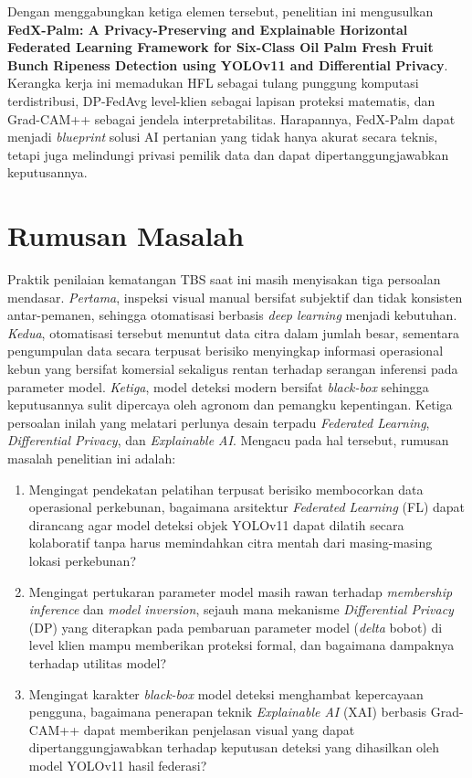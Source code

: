 Dengan menggabungkan ketiga elemen tersebut, penelitian ini mengusulkan \textbf{FedX-Palm: A Privacy-Preserving and Explainable Horizontal Federated Learning Framework for Six-Class Oil Palm Fresh Fruit Bunch Ripeness Detection using YOLOv11 and Differential Privacy}. Kerangka kerja ini memadukan HFL sebagai tulang punggung komputasi terdistribusi, DP-FedAvg level-klien sebagai lapisan proteksi matematis, dan Grad-CAM++ sebagai jendela interpretabilitas. Harapannya, FedX-Palm dapat menjadi \emph{blueprint} solusi AI pertanian yang tidak hanya akurat secara teknis, tetapi juga melindungi privasi pemilik data dan dapat dipertanggungjawabkan keputusannya.

\section{Rumusan Masalah}
\label{sec:rumusan-masalah}
Praktik penilaian kematangan TBS saat ini masih menyisakan tiga persoalan mendasar. \emph{Pertama}, inspeksi visual manual bersifat subjektif dan tidak konsisten antar-pemanen, sehingga otomatisasi berbasis \emph{deep learning} menjadi kebutuhan. \emph{Kedua}, otomatisasi tersebut menuntut data citra dalam jumlah besar, sementara pengumpulan data secara terpusat berisiko menyingkap informasi operasional kebun yang bersifat komersial sekaligus rentan terhadap serangan inferensi pada parameter model. \emph{Ketiga}, model deteksi modern bersifat \emph{black-box} sehingga keputusannya sulit dipercaya oleh agronom dan pemangku kepentingan. Ketiga persoalan inilah yang melatari perlunya desain terpadu \emph{Federated Learning}, \emph{Differential Privacy}, dan \emph{Explainable AI}. Mengacu pada hal tersebut, rumusan masalah penelitian ini adalah:
\begin{enumerate}
    \item Mengingat pendekatan pelatihan terpusat berisiko membocorkan data operasional perkebunan, bagaimana arsitektur \emph{Federated Learning} (FL) dapat dirancang agar model deteksi objek YOLOv11 dapat dilatih secara kolaboratif tanpa harus memindahkan citra mentah dari masing-masing lokasi perkebunan?
    \item Mengingat pertukaran parameter model masih rawan terhadap \emph{membership inference} dan \emph{model inversion}, sejauh mana mekanisme \emph{Differential Privacy} (DP) yang diterapkan pada pembaruan parameter model (\emph{delta} bobot) di level klien mampu memberikan proteksi formal, dan bagaimana dampaknya terhadap utilitas model?
    \item Mengingat karakter \emph{black-box} model deteksi menghambat kepercayaan pengguna, bagaimana penerapan teknik \emph{Explainable AI} (XAI) berbasis Grad-CAM++ dapat memberikan penjelasan visual yang dapat dipertanggungjawabkan terhadap keputusan deteksi yang dihasilkan oleh model YOLOv11 hasil federasi?
\end{enumerate}

